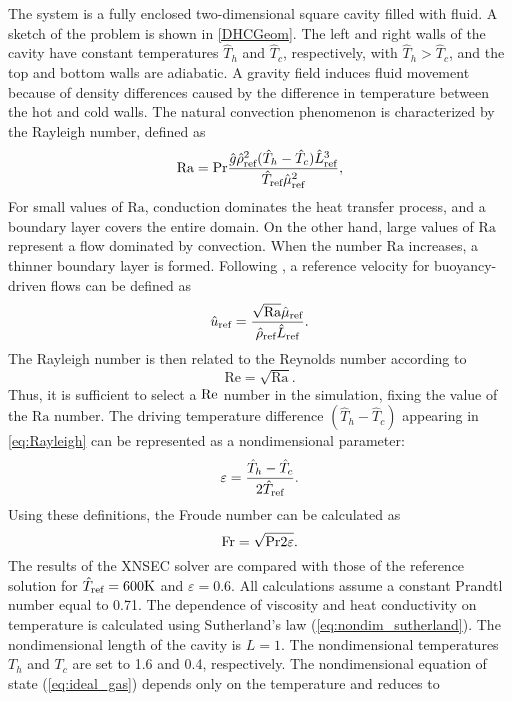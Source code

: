 The system is a fully enclosed two-dimensional square cavity filled with fluid.  A sketch of the problem is shown in \cref{DHCGeom}. The left and right walls of the cavity have constant temperatures $\hat{T}_h$ and $\hat{T}_c$, respectively, with $\hat{T}_h >\hat{T}_c$, and the top and bottom walls are adiabatic. A gravity field induces fluid movement because of density differences caused by the difference in temperature between the hot and cold walls.
The natural convection phenomenon is characterized by the Rayleigh number, defined as
\begin{equation}\label{eq:Rayleigh}
	\text{Ra} = \Prandtl \frac{\hat g \RefVal{\rho}^2(\hat T_h-\hat T_c) \RefVal{L}^3}{\RefVal{T}\RefVal{\mu}^2},
\end{equation}
For small values of $\text{Ra}$, conduction dominates the heat transfer process, and a boundary layer covers the entire domain. On the other hand, large values of $\text{Ra}$ represent a flow dominated by convection. When the number $\text{Ra}$ increases, a thinner boundary layer is formed.
Following \textcite{vierendeelsBenchmarkSolutionsNatural2003}, a reference velocity for buoyancy-driven flows can be defined as
\begin{equation}
	\RefVal{u} = \frac{\sqrt{\text{Ra}} \RefVal{\mu}}{\RefVal{\rho}\RefVal{L}}.
\end{equation}
The Rayleigh number is then related to the Reynolds number according to
\begin{equation}
	\text{Re} = \sqrt{\text{Ra}}.
\end{equation}
Thus, it is sufficient to select a $\Reynolds$ number in the simulation, fixing the value of the $\text{Ra}$ number. The driving temperature difference $(\hat T_h - \hat T_c)$ appearing in \cref{eq:Rayleigh} can be represented as a nondimensional parameter:
\begin{equation}\label{eq:nondimensionalTemperature}
	\varepsilon = \frac{\hat T_h - \hat T_c}{2\RefVal{T}}.
\end{equation}
Using these definitions, the Froude number can be calculated as
\begin{equation}
	\Froude = \sqrt{\Prandtl 2 \varepsilon}.
\end{equation}
The results of the XNSEC solver are compared with those of the reference solution for $\RefVal{T} = 600\si{K}$ and $\varepsilon = 0.6$. All calculations assume a constant Prandtl number equal to 0.71. The dependence of viscosity and heat conductivity on temperature is calculated using Sutherland's law (\cref{eq:nondim_sutherland}). The nondimensional length of the cavity is $L=1$. The nondimensional temperatures $T_h$ and $T_c$ are set to 1.6 and 0.4, respectively. The nondimensional equation of state (\cref{eq:ideal_gas}) depends only on the temperature and reduces to

